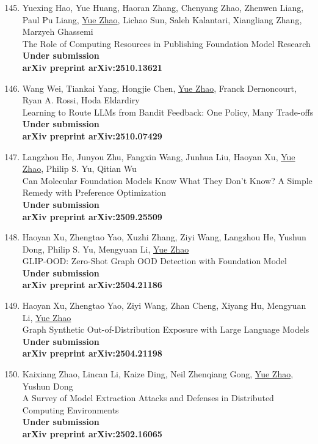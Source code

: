 \documentclass[margin,line,pifont,palatino,courier]{res}
\newenvironment{benumerate}[1]{
    \let\oldItem\item
    \def\item{\addtocounter{enumi}{-2}\oldItem}
    \begin{enumerate}[leftmargin=0.25in,label=\textcolor{uscred}{\arabic*.}]
    \setcounter{enumi}{#1}
    \addtocounter{enumi}{1}
}{
    \end{enumerate}
}
\begin{document}
\begin{resume}
\begin{benumerate}{144}
    \item 
    Yuexing Hao, Yue Huang, Haoran Zhang, Chenyang Zhao, Zhenwen Liang, Paul Pu Liang, \underline{Yue Zhao}, Lichao Sun, Saleh Kalantari, Xiangliang Zhang, Marzyeh Ghassemi \\
    The Role of Computing Resources in Publishing Foundation Model Research \\
    \textbf{Under submission} \\
    \textbf{arXiv preprint arXiv:2510.13621}


    \item 
    Wang Wei, Tiankai Yang, Hongjie Chen, \underline{Yue Zhao}, Franck Dernoncourt, Ryan A. Rossi, Hoda Eldardiry \\
    Learning to Route LLMs from Bandit Feedback: One Policy, Many Trade-offs \\
    \textbf{Under submission} \\
    \textbf{arXiv preprint arXiv:2510.07429}


    \item 
    Langzhou He, Junyou Zhu, Fangxin Wang, Junhua Liu, Haoyan Xu, \underline{Yue Zhao}, Philip S. Yu, Qitian Wu \\
    Can Molecular Foundation Models Know What They Don't Know? A Simple Remedy with Preference Optimization \\
    \textbf{Under submission} \\
    \textbf{arXiv preprint arXiv:2509.25509}



    \item Haoyan Xu, Zhengtao Yao, Xuzhi Zhang, Ziyi Wang, Langzhou He, Yushun Dong, Philip S. Yu, Mengyuan Li, \underline{Yue Zhao}\\
    GLIP-OOD: Zero-Shot Graph OOD Detection with Foundation Model\\
    \textbf{Under submission}\\
    \textbf{arXiv preprint arXiv:2504.21186}


    \item Haoyan Xu, Zhengtao Yao, Ziyi Wang, Zhan Cheng, Xiyang Hu, Mengyuan Li, \underline{Yue Zhao}\\
    Graph Synthetic Out-of-Distribution Exposure with Large Language Models\\
    \textbf{Under submission}\\
    \textbf{arXiv preprint arXiv:2504.21198}


    \item Kaixiang Zhao, Lincan Li, Kaize Ding, Neil Zhenqiang Gong, \underline{Yue Zhao}, Yushun Dong\\
    A Survey of Model Extraction Attacks and Defenses in Distributed Computing Environments\\
    \textbf{Under submission}\\
    \textbf{arXiv preprint arXiv:2502.16065}


\end{benumerate}
\end{resume}
\end{document}
